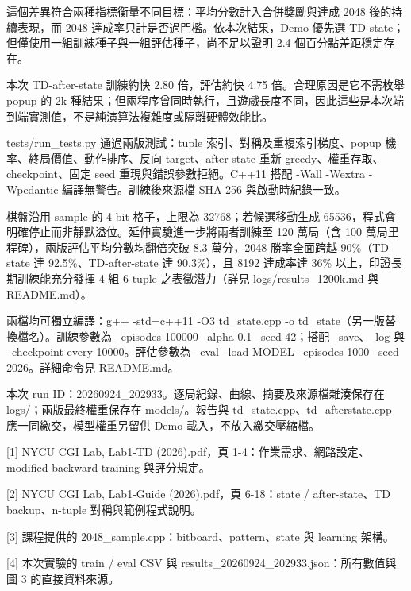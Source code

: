 \documentclass[10pt,a4paper]{article}
\newcommand{\topic}[1]{\par\vspace{5pt}{\sffamily\bfseries\large\color{blue}#1}\par\vspace{2pt}}
\begin{document}
這個差異符合兩種指標衡量不同目標：平均分數計入合併獎勵與達成 2048 後的持續表現，而 2048 達成率只計是否過門檻。依本次結果，Demo 優先選 TD-state；但僅使用一組訓練種子與一組評估種子，尚不足以證明 2.4 個百分點差距穩定存在。\par

本次 TD-after-state 訓練約快 2.80 倍，評估約快 4.75 倍。合理原因是它不需枚舉 popup 的 2k 種結果；但兩程序曾同時執行，且遊戲長度不同，因此這些是本次端到端實測值，不是純演算法複雜度或隔離硬體效能比。\par

\topic{15. 正確性驗證與限制}

tests/run\_tests.py 通過兩版測試：tuple 索引、對稱及重複索引梯度、popup 機率、終局價值、動作排序、反向 target、after-state 重新 greedy、權重存取、checkpoint、固定 seed 重現與錯誤參數拒絕。C++11 搭配 -Wall -Wextra -Wpedantic 編譯無警告。訓練後來源檔 SHA-256 與啟動時紀錄一致。\par

{\small 棋盤沿用 sample 的 4-bit 格子，上限為 32768；若候選移動生成 65536，程式會明確停止而非靜默溢位。延伸實驗進一步將兩者訓練至 120 萬局（含 100 萬局里程碑），兩版評估平均分數均翻倍突破 8.3 萬分，2048 勝率全面跨越 90\%（TD-state 達 92.5\%、TD-after-state 達 90.3\%），且 8192 達成率達 36\% 以上，印證長期訓練能充分發揮 4 組 6-tuple 之表徵潛力（詳見 logs/results\_1200k.md 與 README.md）。\par}

\topic{16. 重現方式與實驗產物}

兩檔均可獨立編譯：g++ -std=c++11 -O3 td\_state.cpp -o td\_state（另一版替換檔名）。訓練參數為 --episodes 100000 --alpha 0.1 --seed 42；搭配 --save、--log 與 --checkpoint-every 10000。評估參數為 --eval --load MODEL --episodes 1000 --seed 2026。詳細命令見 README.md。\par

{\small 本次 run ID：20260924\_202933。逐局紀錄、曲線、摘要及來源檔雜湊保存在 logs/；兩版最終權重保存在 models/。報告與 td\_state.cpp、td\_afterstate.cpp 應一同繳交，模型權重另留供 Demo 載入，不放入繳交壓縮檔。\par}

\topic{參考資料}

{\small [1] NYCU CGI Lab, Lab1-TD (2026).pdf，頁 1-4：作業需求、網路設定、modified backward training 與評分規定。

[2] NYCU CGI Lab, Lab1-Guide (2026).pdf，頁 6-18：state / after-state、TD backup、n-tuple 對稱與範例程式說明。

[3] 課程提供的 2048\_sample.cpp：bitboard、pattern、state 與 learning 架構。

[4] 本次實驗的 train / eval CSV 與 results\_20260924\_202933.json：所有數值與圖 3 的直接資料來源。\par}
\end{document}
